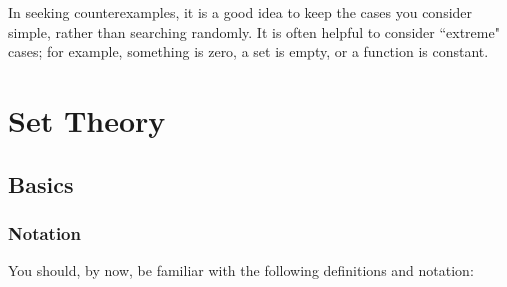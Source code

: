In seeking counterexamples, it is a good idea to keep the cases you consider simple, rather than searching randomly. It is often helpful to consider ``extreme" cases; for example, something is zero, a set is empty, or a function is constant.

\chapter{Set Theory}
\section{Basics}
\subsection{Notation}
You should, by now, be familiar with the following definitions and notation:
